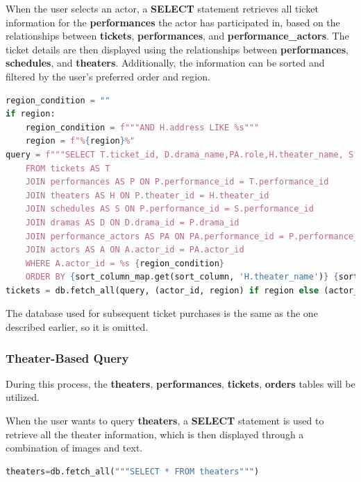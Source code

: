 \documentclass[12pt]{article}
\begin{document}
\par When the user selects an actor, a \textbf{SELECT} statement retrieves all ticket information for the \textbf{performances} the actor has participated in, based on the relationships between \textbf{tickets}, \textbf{performances}, and \textbf{performance\_actors}. The ticket details are then displayed using the relationships between \textbf{performances}, \textbf{schedules}, and \textbf{theaters}. Additionally, the information can be sorted and filtered by the user's preferred order and region.
\begin{tcolorbox}[colframe=black, colback=white, boxrule=0.4mm, sharp corners=southwest, title=Excerpt of Search Tickets Code]
    \begin{lstlisting}[language=Python, breaklines=true]
region_condition = ""
if region:
    region_condition = f"""AND H.address LIKE %s"""
    region = f"%{region}%"  
query = f"""SELECT T.ticket_id, D.drama_name,PA.role,H.theater_name, S.start_time, S.end_time, T.class, T.price, T.left_tickets
    FROM tickets AS T
    JOIN performances AS P ON P.performance_id = T.performance_id
    JOIN theaters AS H ON P.theater_id = H.theater_id
    JOIN schedules AS S ON P.performance_id = S.performance_id
    JOIN dramas AS D ON D.drama_id = P.drama_id
    JOIN performance_actors AS PA ON PA.performance_id = P.performance_id
    JOIN actors AS A ON A.actor_id = PA.actor_id
    WHERE A.actor_id = %s {region_condition}
    ORDER BY {sort_column_map.get(sort_column, 'H.theater_name')} {sort_order_sql}"""
tickets = db.fetch_all(query, (actor_id, region) if region else (actor_id,))
\end{lstlisting}
\end{tcolorbox}
\par The database used for subsequent ticket purchases is the same as the one described earlier, so it is omitted.

\subsubsection{Theater-Based Query}
\par During this process, the \textbf{theaters}, \textbf{performances}, \textbf{tickets}, \textbf{orders} tables will be utilized. 
\par When the user wants to query \textbf{theaters}, a \textbf{SELECT} statement is used to retrieve all the theater information, which is then displayed through a combination of images and text.
\begin{tcolorbox}[colframe=black, colback=white, boxrule=0.4mm, sharp corners=southwest, title=Excerpt of Search Theaters Code]
    \begin{lstlisting}[language=Python, breaklines=true]
theaters=db.fetch_all("""SELECT * FROM theaters""")
\end{lstlisting}
\end{tcolorbox}
\end{document}
